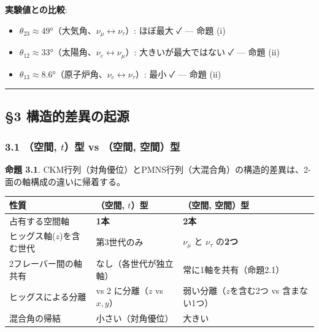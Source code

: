\documentclass[
  a4paper,11pt]{ltjsarticle}
\newcounter{none} %
\providecommand{\tightlist}{%
  \setlength{\itemsep}{0pt}\setlength{\parskip}{0pt}}
\begin{document}
\textbf{実験値との比較}:

\begin{itemize}
\tightlist
\item
  \(\theta_{23} \approx 49°\)（大気角、\(\nu_\mu \leftrightarrow \nu_\tau\)）:
  ほぼ最大 ✓ --- 命題 (i)
\item
  \(\theta_{12} \approx 33°\)（太陽角、\(\nu_e \leftrightarrow \nu_\mu\)）:
  大きいが最大ではない ✓ --- 命題 (ii)
\item
  \(\theta_{13} \approx 8.6°\)（原子炉角、\(\nu_e \leftrightarrow \nu_\tau\)）:
  最小 ✓ --- 命題 (ii)
\end{itemize}

\begin{center}\rule{0.5\linewidth}{0.5pt}\end{center}

\subsection{§3
構造的差異の起源}\label{ux69cbux9020ux7684ux5deeux7570ux306eux8d77ux6e90}

\subsubsection{\texorpdfstring{3.1 （空間, \(t\)）型 vs （空間,
空間）型}{3.1 （空間, t）型 vs （空間, 空間）型}}\label{ux7a7aux9593-tux578b-vs-ux7a7aux9593-ux7a7aux9593ux578b}

\textbf{命題 3.1}.
CKM行列（対角優位）とPMNS行列（大混合角）の構造的差異は、2-面の軸構成の違いに帰着する。

{\def\LTcaptype{none} %
\begin{longtable}[]{@{}
  >{\raggedright\arraybackslash}p{}
  >{\raggedright\arraybackslash}p{}
  >{\raggedright\arraybackslash}p{}@{}}
\toprule\noalign{}
\begin{minipage}[b]{\linewidth}\raggedright
性質
\end{minipage} & \begin{minipage}[b]{\linewidth}\raggedright
（空間, \(t\)）型
\end{minipage} & \begin{minipage}[b]{\linewidth}\raggedright
（空間, 空間）型
\end{minipage} \\
\midrule\noalign{}
\endhead
\bottomrule\noalign{}
\endlastfoot
占有する空間軸 & \textbf{1本} & \textbf{2本} \\
ヒッグス軸(\(z\))を含む世代 & 第3世代のみ & \(\nu_\mu\) と \(\nu_\tau\)
の\textbf{2つ} \\
2フレーバー間の軸共有 & なし（各世代が独立軸） &
常に1軸を共有（命題2.1） \\
ヒッグスによる分離 & 1 vs 2 に分離（\(z\) vs \(x,y\)） &
弱い分離（\(z\)を含む2つ vs 含まない1つ） \\
混合角の帰結 & 小さい（対角優位） & 大きい \\
\end{longtable}
}
\end{document}
